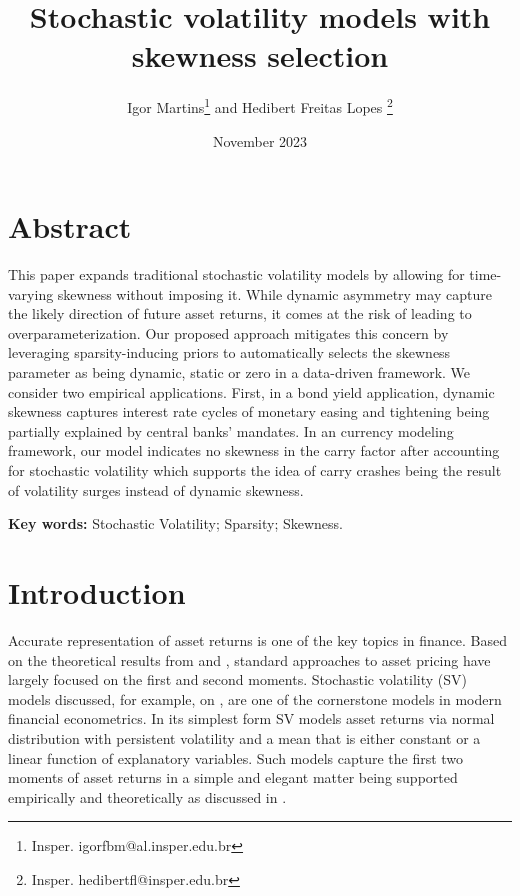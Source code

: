 \documentclass{article}
\title{Stochastic volatility models with skewness selection}
\author{Igor Martins\footnote{Insper. igorfbm@al.insper.edu.br} and Hedibert Freitas Lopes \footnote{Insper. hedibertfl@insper.edu.br}}
\date{November 2023}
\begin{document}
\maketitle

\section*{Abstract}

\noindent This paper expands traditional stochastic volatility models by allowing for time-varying skewness without imposing it. While dynamic asymmetry may capture the likely direction of future asset returns, it comes at the risk of leading to overparameterization. Our proposed approach mitigates this concern by leveraging sparsity-inducing priors to automatically selects the skewness parameter as being dynamic, static or zero in a data-driven framework. We consider two empirical applications. First, in a bond yield application, dynamic skewness captures interest rate cycles of monetary easing and tightening being partially explained by central banks' mandates. In an currency modeling framework, our model indicates no skewness in the carry factor after accounting for stochastic volatility which supports the idea of carry crashes being the result of volatility surges instead of dynamic skewness.

\vspace{0.5cm}

\noindent \textbf{Key words:} Stochastic Volatility; Sparsity; Skewness.

\section{Introduction}

Accurate representation of asset returns is one of the key topics in finance. Based on the theoretical results from \cite{markowitz1952} and \cite{hansen1987role}, standard approaches to asset pricing have largely focused on the first and second moments. Stochastic volatility (SV) models discussed, for example, on \cite{jacquier2002bayesian}, are one of the cornerstone models in modern financial econometrics. In its simplest form SV models asset returns via normal distribution with persistent volatility and a mean that is either constant or a linear function of explanatory variables. Such models capture the first two moments of asset returns in a simple and elegant matter being supported empirically and theoretically as discussed in \cite{shephard2005stochastic}. 
\end{document}
